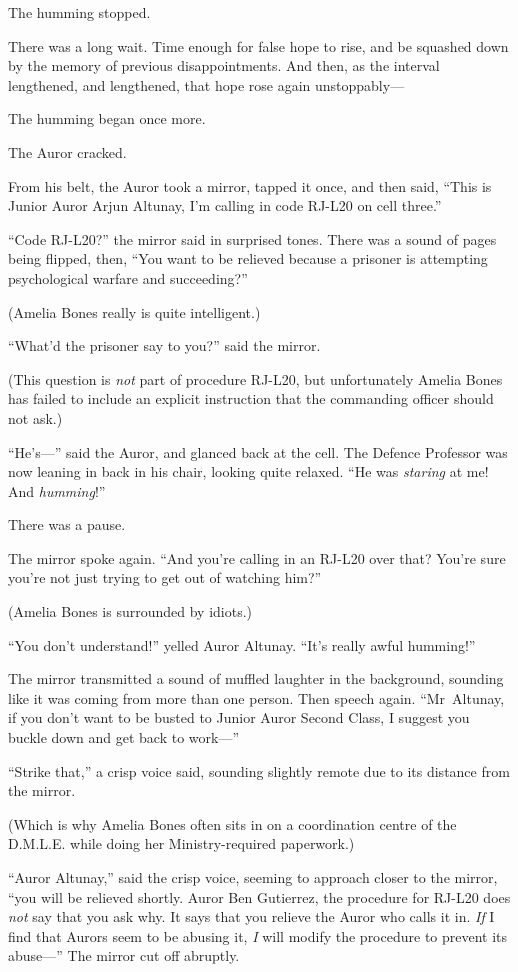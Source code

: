 The humming stopped.

There was a long wait. Time enough for false hope to rise, and be squashed down by the memory of previous disappointments. And then, as the interval lengthened, and lengthened, that hope rose again unstoppably—

The humming began once more.

The Auror cracked.

From his belt, the Auror took a mirror, tapped it once, and then said, “This is Junior Auror Arjun Altunay, I’m calling in code RJ-L20 on cell three.”

“Code RJ-L20?” the mirror said in surprised tones. There was a sound of pages being flipped, then, “You want to be relieved because a prisoner is attempting psychological warfare and succeeding?”

(Amelia Bones really is quite intelligent.)

“What’d the prisoner say to you?” said the mirror.

(This question is \emph{not} part of procedure RJ-L20, but unfortunately Amelia Bones has failed to include an explicit instruction that the commanding officer should not ask.)

“He’s—” said the Auror, and glanced back at the cell. The Defence Professor was now leaning in back in his chair, looking quite relaxed. “He was \emph{staring} at me! And \emph{humming}!”

There was a pause.

The mirror spoke again. “And you’re calling in an RJ-L20 over that? You’re sure you’re not just trying to get out of watching him?”

(Amelia Bones is surrounded by idiots.)

“You don’t understand!” yelled Auror Altunay. “It’s really awful humming!”

The mirror transmitted a sound of muffled laughter in the background, sounding like it was coming from more than one person. Then speech again. “Mr~Altunay, if you don’t want to be busted to Junior Auror Second Class, I suggest you buckle down and get back to work—”

“Strike that,” a crisp voice said, sounding slightly remote due to its distance from the mirror.

(Which is why Amelia Bones often sits in on a coordination centre of the D.M.L.E. while doing her Ministry-required paperwork.)

“Auror Altunay,” said the crisp voice, seeming to approach closer to the mirror, “you will be relieved shortly. Auror Ben Gutierrez, the procedure for RJ-L20 does \emph{not} say that you ask why. It says that you relieve the Auror who calls it in. \emph{If} I find that Aurors seem to be abusing it, \emph{I} will modify the procedure to prevent its abuse—” The mirror cut off abruptly.

